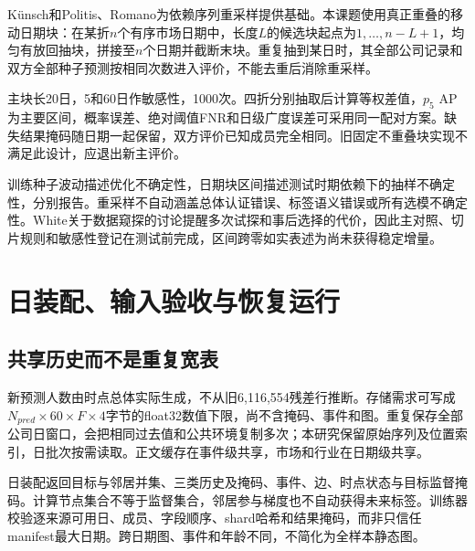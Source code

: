 
K\"unsch和Politis、Romano为依赖序列重采样提供基础\cite{r31,r32}。本课题使用真正重叠的移动日期块：在某折$n$个有序市场日期中，长度$L$的候选块起点为$1,\ldots,n-L+1$，均匀有放回抽块，拼接至$n$个日期并截断末块。重复抽到某日时，其全部公司记录和双方全部种子预测按相同次数进入评价，不能去重后消除重采样。

主块长20日，5和60日作敏感性，1000次。四折分别抽取后计算等权差值，$p_5$ AP为主要区间，概率误差、绝对阈值FNR和日级广度误差可采用同一配对方案。缺失结果掩码随日期一起保留，双方评价已知成员完全相同。旧固定不重叠块实现不满足此设计，应退出新主评价。

训练种子波动描述优化不确定性，日期块区间描述测试时期依赖下的抽样不确定性，分别报告。重采样不自动涵盖总体认证错误、标签语义错误或所有选模不确定性。White关于数据窥探的讨论\cite{r34}提醒多次试探和事后选择的代价，因此主对照、切片规则和敏感性登记在测试前完成，区间跨零如实表述为尚未获得稳定增量。

\section{日装配、输入验收与恢复运行}
\subsection{共享历史而不是重复宽表}
新预测人数由时点总体实际生成，不从旧6,116,554残差行推断。存储需求可写成$N_{pred}\times60\times F\times4$字节的float32数值下限，尚不含掩码、事件和图。重复保存全部公司日窗口，会把相同过去值和公共环境复制多次；本研究保留原始序列及位置索引，日批次按需读取。正文缓存在事件级共享，市场和行业在日期级共享。

日装配返回目标与邻居并集、三类历史及掩码、事件、边、时点状态与目标监督掩码。计算节点集合不等于监督集合，邻居参与梯度也不自动获得未来标签。训练器校验逐来源可用日、成员、字段顺序、shard哈希和结果掩码，而非只信任manifest最大日期。跨日期图、事件和年龄不同，不简化为全样本静态图。


